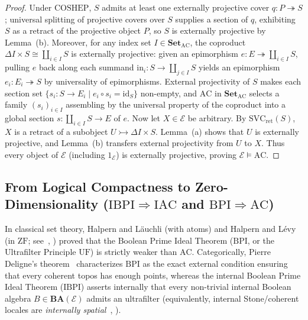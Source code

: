 \begin{proof}
Under $\mathrm{COSHEP}$, $S$ admits at least one externally projective cover $q : P \twoheadrightarrow S$; universal splitting of projective covers over $S$ supplies a section of $q$, exhibiting $S$ as a retract of the projective object $P$, so $S$ is externally projective by Lemma~(b). Moreover, for any index set $I \in \mathbf{Set}_{\mathrm{AC}}$, the coproduct $\Delta I \times S \cong \coprod_{i \in I} S$ is externally projective: given an epimorphism $e : E \twoheadrightarrow \coprod_{i \in I} S$, pulling $e$ back along each summand $\mathrm{in}_i : S \to \coprod_{j \in I} S$ yields an epimorphism $e_i : E_i \twoheadrightarrow S$ by universality of epimorphisms. External projectivity of $S$ makes each section set $\{s_i : S \to E_i \mid e_i \circ s_i = \mathrm{id}_S\}$ non-empty, and $\mathrm{AC}$ in $\mathbf{Set}_{\mathrm{AC}}$ selects a family $(s_i)_{i \in I}$ assembling by the universal property of the coproduct into a global section $s : \coprod_{i \in I} S \to E$ of $e$. Now let $X \in \mathcal{E}$ be arbitrary. By $\mathrm{SVC}_{\mathrm{ret}}(S)$, $X$ is a retract of a subobject $U \rightarrowtail \Delta I \times S$. Lemma~(a) shows that $U$ is externally projective, and Lemma~(b) transfers external projectivity from $U$ to $X$. Thus every object of $\mathcal{E}$ (including $1_{\mathcal{E}}$) is externally projective, proving $\mathcal{E} \models \mathrm{AC}$.
\end{proof}

\subsection{From Logical Compactness to Zero-Dimensionality ($\mathrm{IBPI} \Rightarrow \mathrm{IAC}$ and $\mathrm{BPI} \Rightarrow \mathrm{AC}$)}

In classical set theory, Halpern and L\"auchli (with atoms) and Halpern and L\'evy~\cite{HalpernLevy71} (in $\mathrm{ZF}$; see~\cite[Ch.~II, \S\S 3--4]{Johnstone82}, \cite[\S D3.3]{Johnstone02}) proved that the Boolean Prime Ideal Theorem ($\mathrm{BPI}$, or the Ultrafilter Principle $\mathrm{UF}$) is strictly weaker than $\mathrm{AC}$. Categorically, Pierre Deligne's theorem~\cite[Exp.~VI, Appendice]{Deligne72} characterizes $\mathrm{BPI}$ as the exact external condition ensuring that every coherent topos has enough points, whereas the internal Boolean Prime Ideal Theorem ($\mathrm{IBPI}$) asserts internally that every non-trivial internal Boolean algebra $B \in \mathbf{BA}(\mathcal{E})$ admits an ultrafilter (equivalently, internal Stone/coherent locales are \emph{internally spatial}~\cite[Ch.~II, \S\S 3--4]{Johnstone82}, \cite[\S D3.3, Thm.~D3.3.13]{Johnstone02}).


